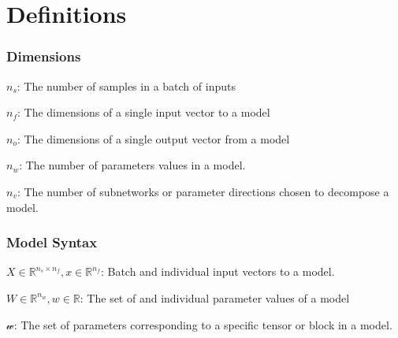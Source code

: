 \documentclass{article}
\theoremstyle{plain}
\theoremstyle{definition}
\theoremstyle{remark}
\begin{document}


\clearpage




\newpage
\appendix
\renewcommand{\thefigure}{S\arabic{figure}}  %
\renewcommand{\theHfigure}{S\arabic{figure}} %
\setcounter{figure}{0}  %
\onecolumn


\section{Definitions}

\subsubsection{Dimensions}
$n_s$: The number of samples in a batch of inputs 

$n_f$: The dimensions of a single input vector to a model

$n_o$: The dimensions of a single output vector from a model

$n_w$: The number of parameters values in a model.

$n_v$: The number of subnetworks or parameter directions chosen to decompose a model. 


\subsubsection{Model Syntax}
$X \in \mathbb{R}^{n_s \times n_f}, x \in \mathbb{R}^{n_f}$: Batch and individual input vectors to a model.

$W \in \mathbb{R}^{n_w}, w \in \mathbb{R}$: The set of and individual parameter values of a model

$\mathcal{w}$: The set of parameters corresponding to a specific tensor or block in a model.
\end{document}
